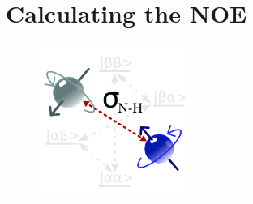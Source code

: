 


\chapter{Calculating the NOE} \label{ch: NOE}


\begin{figure}[h]
  \includegraphics[width=5cm, bb=0 0 1701 1701]{graphics/analyses/noe_600x600}
\end{figure}


